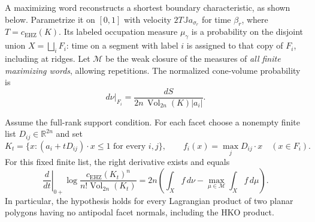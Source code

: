 A maximizing word reconstructs a shortest boundary characteristic, as shown
below. Parametrize it on $[0,1]$ with velocity $2T\mathbb{J} a_{\sigma_r}$ for time
$\beta_r$, where $T=c_{\mathrm{EHZ}}(K)$. Its labeled occupation measure
$\mu_\gamma$ is a probability on the disjoint union
$X=\bigsqcup_iF_i$: time on a segment with label $i$ is assigned to that
copy of $F_i$, including at ridges. Let $\mathcal M$ be the weak closure of
the measures of \emph{all finite maximizing words}, allowing repetitions.
The normalized cone-volume probability is
\begin{equation}\label{eq:mc-nu}
 d\nu|_{F_i}=\frac{dS}{2n\,\operatorname{Vol}_{2n}(K)|a_i|}.
\end{equation}

\begin{theorem}\label{thm:mc-derivative}
Assume the full-rank support condition. For each facet choose a nonempty
finite list $D_{ij}\in\mathbb R^{2n}$ and set
\[
 K_t=\{x:(a_i+tD_{ij})\cdot x\leq1\text{ for every }i,j\},\qquad
 f_i(x)=\max_jD_{ij}\cdot x\quad(x\in F_i).
\]
For this fixed finite list, the right derivative exists and equals
\begin{equation}\label{eq:mc-derivative}
 \left.\frac{d}{dt}\right|_{0+}
 \log\frac{c_{\mathrm{EHZ}}(K_t)^n}{n!\operatorname{Vol}_{2n}(K_t)}
 =2n\left(\int_X f\,d\nu-
                  \max_{\mu\in\mathcal M}\int_X f\,d\mu\right).
\end{equation}
In particular, the hypothesis holds for every Lagrangian product of two
planar polygons having no antipodal facet normals, including the HKO product.
\end{theorem}


